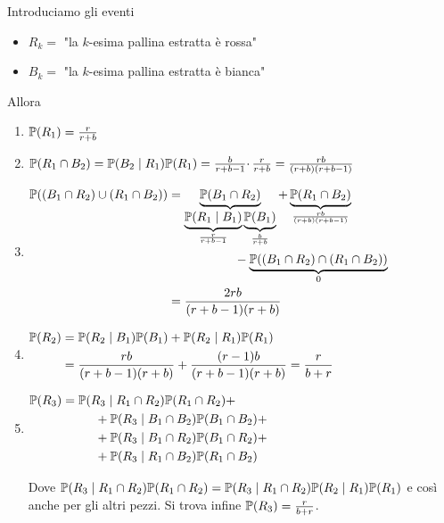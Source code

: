 \Soluzione
\Soluzione
\Soluzione

Introduciamo gli eventi
\begin{itemize}
\item $R_{k} =$ "la $k$-esima pallina estratta è rossa"
\item $B_{k} =$ "la $k$-esima pallina estratta è bianca"
\end{itemize}

Allora
\begin{enumerate}
\item $\mathbb{P}( R_{1}) =\frac{r}{r+b}$
\item $\mathbb{P}( R_{1} \cap B_{2}) =\mathbb{P}( B_{2} \mid R_{1})\mathbb{P}( R_{1}) =\frac{b}{r+b-1} \cdotp \frac{r}{r+b} =\frac{rb}{( r+b)( r+b-1)}$
\item $\begin{aligned}
\mathbb{P}(( B_{1} \cap R_{2}) \cup ( R_{1} \cap B_{2})) & =\underbrace{\mathbb{P}( B_{1} \cap R_{2})}_{\underbrace{\mathbb{P}( R_{1} \mid B_{1})}_{\frac{r}{r+b-1}}\underbrace{\mathbb{P}( B_{1})}_{\frac{b}{r+b}}} +\underbrace{\mathbb{P}( R_{1} \cap B_{2})}_{\frac{rb}{( r+b)( r+b-1)}}\\
 & \ \ \ \ \ \ \ \ \ \ \ \ \ \ \ \ -\underbrace{\mathbb{P}(( B_{1} \cap R_{2}) \cap ( R_{1} \cap B_{2}))}_{0}\\
 & =\frac{2rb}{( r+b-1)( r+b)}
\end{aligned}$
\item $\begin{aligned}
\mathbb{P}( R_{2}) & =\mathbb{P}( R_{2} \mid B_{1})\mathbb{P}( B_{1}) +\mathbb{P}( R_{2} \mid R_{1})\mathbb{P}( R_{1})\\
 & =\frac{rb}{( r+b-1)( r+b)} +\frac{( r-1) b}{( r+b-1)( r+b)} =\frac{r}{b+r}
\end{aligned}$
\item $\begin{aligned}
\mathbb{P}( R_{3}) & =\mathbb{P}( R_{3} \mid R_{1} \cap R_{2})\mathbb{P}( R_{1} \cap R_{2}) +\\
 & \ \ \ \ \ \ \ \ +\mathbb{P}( R_{3} \mid B_{1} \cap B_{2})\mathbb{P}( B_{1} \cap B_{2}) +\\
 & \ \ \ \ \ \ \ \ +\mathbb{P}( R_{3} \mid B_{1} \cap R_{2})\mathbb{P}( B_{1} \cap R_{2}) +\\
 & \ \ \ \ \ \ \ \ +\mathbb{P}( R_{3} \mid R_{1} \cap B_{2})\mathbb{P}( R_{1} \cap B_{2})
\end{aligned}$

Dove $\mathbb{P}( R_{3} \mid R_{1} \cap R_{2})\mathbb{P}( R_{1} \cap R_{2}) =\mathbb{P}( R_{3} \mid R_{1} \cap R_{2})\mathbb{P}( R_{2} \mid R_{1})\mathbb{P}( R_{1})$ e così anche per gli altri pezzi. Si trova infine $\mathbb{P}( R_{3}) =\frac{r}{b+r}$.
\end{enumerate}
